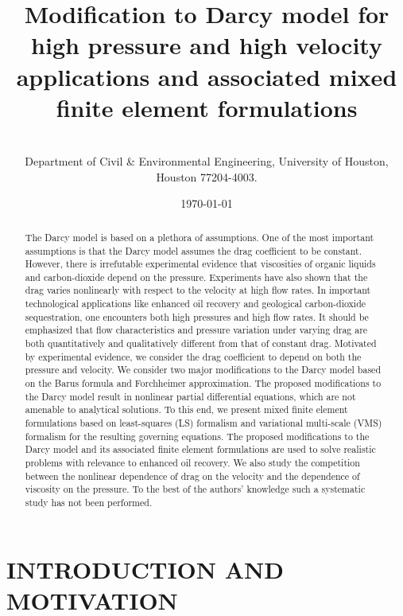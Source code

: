 \documentclass[11pt,reqno]{amsart}
\title{Modification to Darcy model for high pressure and 
high velocity applications and associated mixed finite 
element formulations}
\author{} \thanks{*{\tiny Graduate student}}
\author{ \\ 
{\tiny Department of Civil \& Environmental Engineering, 
University of Houston, Houston 77204-4003.}}
\date{\today}
\begin{document}
\maketitle

\vspace{-0.3in} 

\begin{abstract}
The Darcy model is based on a plethora of assumptions. One 
of the most important assumptions is that the Darcy model 
assumes the drag coefficient to be constant. However, 
there is irrefutable experimental evidence that viscosities 
of organic liquids and carbon-dioxide depend on the 
pressure. Experiments have also shown that the drag 
varies nonlinearly with respect to the velocity at 
high flow rates. In important technological applications 
like enhanced oil recovery and geological carbon-dioxide 
sequestration, one encounters both high pressures 
and high flow rates. It should be emphasized that 
flow characteristics and pressure variation under 
varying drag are both quantitatively and qualitatively 
different from that of constant drag. 
Motivated by experimental evidence, we consider the 
drag coefficient to depend on both the pressure and 
velocity. We consider two major modifications to the
Darcy model based on the Barus formula and Forchheimer 
approximation. The proposed modifications to the Darcy 
model result in nonlinear partial differential equations, 
which are not amenable to analytical solutions. To this 
end, we present mixed finite element formulations based 
on least-squares (LS) formalism and variational multi-scale 
(VMS) formalism for the resulting governing equations. The 
proposed modifications to the Darcy model and its associated 
finite element formulations are used to solve realistic 
problems with relevance to enhanced oil recovery. 
We also study the competition between the nonlinear 
dependence of drag on the velocity and the dependence 
of viscosity on the pressure. To the best of the authors' 
knowledge such a systematic study has not been 
performed. 
\end{abstract}



\section{INTRODUCTION AND MOTIVATION}
\label{Ch:Intro}
\end{document}
